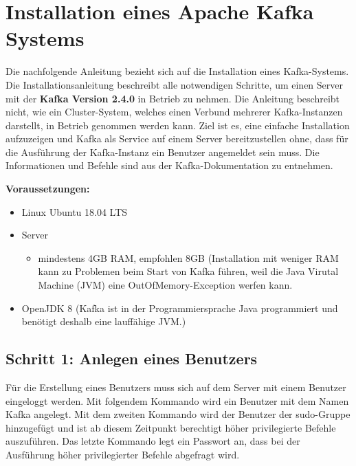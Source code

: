 \documentclass[a4paper,titlepage,halfparskip,12pt]{scrreprt}
\begin{document}

\newpage
\appendix
{}

\chapter{Installation eines Apache Kafka Systems}
\label{InstallationKafka}

Die nachfolgende Anleitung bezieht sich auf die Installation eines Kafka-Systems. Die Installationsanleitung beschreibt alle notwendigen Schritte, um einen Server mit der \textbf{Kafka Version 2.4.0} in Betrieb zu nehmen. Die Anleitung beschreibt nicht, wie ein Cluster-System, welches einen Verbund mehrerer Kafka-Instanzen darstellt, in Betrieb genommen werden kann. Ziel ist es, eine einfache Installation aufzuzeigen und Kafka als Service auf einem Server bereitzustellen ohne, dass für die Ausführung der Kafka-Instanz ein Benutzer angemeldet sein muss. Die Informationen und Befehle sind aus der Kafka-Dokumentation \cite{kafkaDoc} zu entnehmen.

\bigskip

\textbf{Voraussetzungen:}

\smallskip

\begin{itemize}
\item Linux Ubuntu 18.04 LTS
\item Server
\begin{itemize}
\item mindestens 4GB RAM, empfohlen 8GB (Installation mit weniger RAM kann zu Problemen beim Start von Kafka führen, weil die Java Virutal Machine (JVM) eine \glqq OutOfMemory\grqq -Exception werfen kann.
\end{itemize}
\item OpenJDK 8 (Kafka ist in der Programmiersprache Java programmiert und benötigt deshalb eine lauffähige JVM.)
\end{itemize}

\section{Schritt 1: Anlegen eines Benutzers}

Für die Erstellung eines Benutzers muss sich auf dem Server mit einem Benutzer eingeloggt werden. Mit folgendem Kommando wird ein Benutzer mit dem Namen Kafka angelegt. Mit dem zweiten Kommando wird der Benutzer der \glqq sudo\grqq -Gruppe hinzugefügt und ist ab diesem Zeitpunkt berechtigt höher privilegierte Befehle auszuführen. Das letzte Kommando legt ein Passwort an, dass bei der Ausführung höher privilegierter Befehle abgefragt wird.
\end{document}
